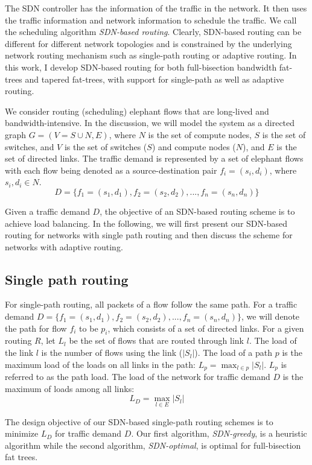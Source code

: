 The SDN controller has the information of the traffic in
the network. It then uses the traffic information and network information
to schedule the traffic. We call the scheduling algorithm {\em SDN-based
routing}. Clearly, SDN-based routing can be different
for different network topologies and is constrained by the underlying
network routing mechanism such as single-path routing or adaptive routing. 
In this work, I develop SDN-based routing for both full-bisection bandwidth
fat-trees and tapered fat-trees, with support for single-path as well as
adaptive routing.

We consider routing (scheduling) elephant flows that are long-lived
and bandwidth-intensive. In the discussion, we will
model the system as a directed
graph \( G = (V=S\cup N, E) \), where $N$ is the set of compute nodes,
$S$ is the set of switches, and $V$ is the set of switches ($S$) and
compute nodes ($N$), and \( E \) is the set of directed links.
The traffic demand is represented by a set of
elephant flows with each flow being denoted as a source-destination pair
$f_i = (s_i, d_i)$, where $s_i, d_i \in N$.
\[D = \{f_1=(s_1, d_1), f_2=(s_2, d_2), ..., f_n = (s_n, d_n)\}\] 

Given a traffic demand $D$, the objective of an SDN-based routing scheme is to
achieve load balancing. In the following, we will first present our SDN-based
routing for networks with single path routing and then discuss the
scheme for networks with adaptive routing.

\subsection{Single path routing}

For single-path routing, all packets of a flow
follow the same path. For a traffic demand
$D = \{f_1=(s_1, d_1), f_2=(s_2, d_2), ..., f_n = (s_n, d_n)\}$, 
we will denote the path for flow $f_i$ to be $p_i$, which consists of a set
of directed links. For a given routing $R$,
let $L_l$ be the set of flows that are routed through link $l$.
The load of the link $l$ is the number of flows using the link ($|S_l|$).
The load of a path $p$ is the maximum load of the loads on all links
in the path: $L_p = \max_{l \in p} {|S_l|}$. $L_p$ is referred to as the path
load. The load of the network for traffic demand $D$
is the maximum of loads among all links:
\[L_D = \max_{l\in E} {|S_l|}\]

The design objective of our SDN-based single-path routing schemes is to
minimize $L_D$ for traffic demand $D$. Our first algorithm,
\textit{SDN-greedy}, is a heuristic algorithm while the second algorithm,
\textit{SDN-optimal}, is optimal for full-bisection fat trees. 

